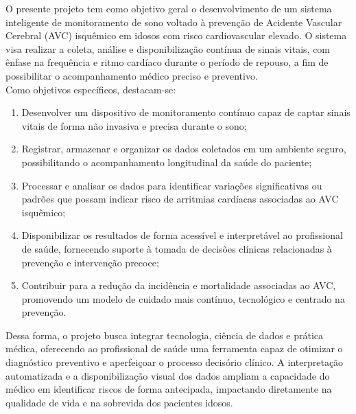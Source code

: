 O presente projeto tem como objetivo geral o desenvolvimento de um sistema inteligente de monitoramento de sono voltado à prevenção de Acidente Vascular Cerebral (AVC) isquêmico em idosos com risco cardiovascular elevado. O sistema visa realizar a coleta, análise e disponibilização contínua de sinais vitais, com ênfase na frequência e ritmo cardíaco durante o período de repouso, a fim de possibilitar o acompanhamento médico preciso e preventivo.\\

Como objetivos específicos, destacam-se:\\

\begin{enumerate}[itemsep=1em]
    \item Desenvolver um dispositivo de monitoramento contínuo capaz de captar sinais vitais de forma não invasiva e precisa durante o sono;
    \item Registrar, armazenar e organizar os dados coletados em um ambiente seguro, possibilitando o acompanhamento longitudinal da saúde do paciente;
    \item Processar e analisar os dados para identificar variações significativas ou padrões que possam indicar risco de arritmias cardíacas associadas ao AVC isquêmico;
    \item Disponibilizar os resultados de forma acessível e interpretável ao profissional de saúde, fornecendo suporte à tomada de decisões clínicas relacionadas à prevenção e intervenção precoce;
    \item Contribuir para a redução da incidência e mortalidade associadas ao AVC, promovendo um modelo de cuidado mais contínuo, tecnológico e centrado na prevenção.\\
\end{enumerate}

Dessa forma, o projeto busca integrar tecnologia, ciência de dados e prática médica, oferecendo ao profissional de saúde uma ferramenta capaz de otimizar o diagnóstico preventivo e aperfeiçoar o processo decisório clínico. A interpretação automatizada e a disponibilização visual dos dados ampliam a capacidade do médico em identificar riscos de forma antecipada, impactando diretamente na qualidade de vida e na sobrevida dos pacientes idosos.